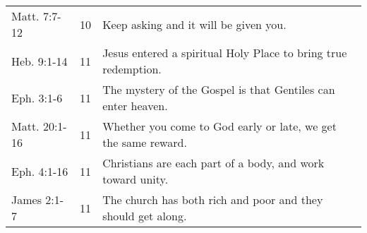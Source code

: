 \begin{table}[h]
\begin{tabular}{lrp{11cm}}
Matt. 7:7-12    & 10 & Keep asking and it will be given you.\\
Heb. 9:1-14     & 11 & Jesus entered a spiritual Holy Place to bring true redemption.\\
Eph. 3:1-6      & 11 & The mystery of the Gospel is that Gentiles can enter heaven.\\
Matt. 20:1-16   & 11 & Whether you come to God early or late, we get the same reward.\\
Eph. 4:1-16     & 11 & Christians are each part of a body, and work toward unity.\\
James 2:1-7     & 11 & The church has both rich and poor and they should get along.\\
\bottomrule
\end{tabular}
\label{tab:ScriptureReference}
\end{table}
